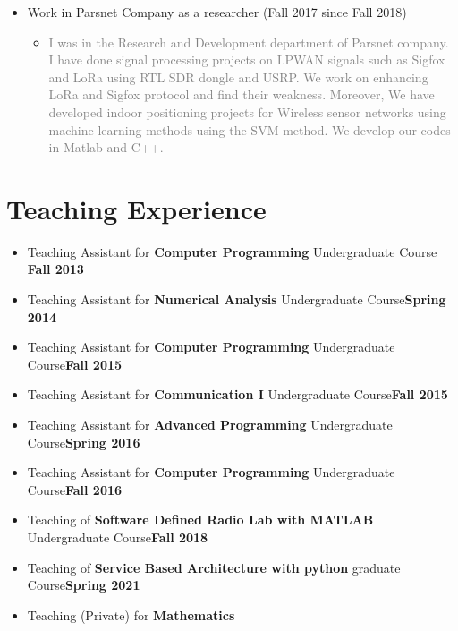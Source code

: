 \documentclass[10pt,a4paper,sans]{moderncv} %
\begin{document}
\begin{itemize}
\item Work in Parsnet Company as a  researcher (Fall 2017 since Fall 2018)
\begin{itemize}
\item
\textcolor{gray}{I was in the Research and Development department of Parsnet company. I have done signal processing projects on LPWAN signals such as Sigfox and LoRa using RTL SDR dongle and USRP. We work on enhancing LoRa and Sigfox protocol and find their weakness. Moreover, We have developed indoor positioning projects for Wireless sensor networks using machine learning methods using the SVM method. We develop our codes in Matlab and C++.}
\end{itemize}
\end{itemize}
\section{Teaching Experience}

\begin{itemize}
\item Teaching Assistant for \textbf{Computer Programming} Undergraduate Course \hfill \textbf{Fall 2013}

\item Teaching Assistant for \textbf{Numerical Analysis} Undergraduate Course\hfill \textbf{Spring 2014}

\item Teaching Assistant for \textbf{Computer Programming} Undergraduate Course\hfill \textbf{Fall 2015}

\item Teaching Assistant for \textbf{Communication I} Undergraduate Course\hfill \textbf{Fall 2015}

\item Teaching Assistant for \textbf{Advanced Programming} Undergraduate Course\hfill \textbf{Spring 2016}

\item Teaching Assistant for \textbf{Computer Programming} Undergraduate Course\hfill \textbf{Fall 2016}

\item Teaching of \textbf{Software Defined Radio Lab with MATLAB} Undergraduate Course\hfill \textbf{Fall 2018}

\item Teaching of \textbf{Service Based Architecture with python} graduate Course\hfill \textbf{Spring 2021}

\item Teaching (Private) for \textbf{Mathematics} 
\end{itemize}
\end{document}
